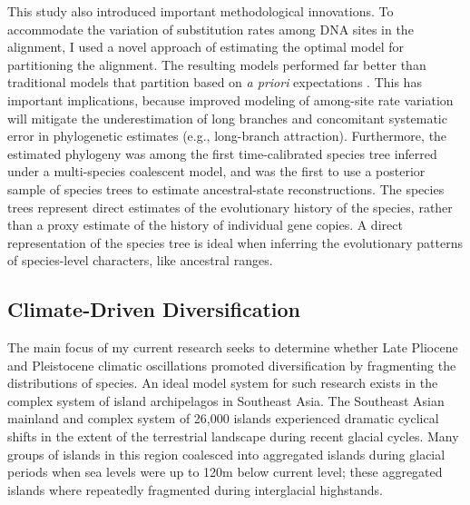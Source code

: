 \documentclass[10pt]{article}
\begin{document}
This study also introduced important methodological innovations.
To accommodate the variation of substitution rates among DNA sites in the alignment, I used a novel approach of estimating the optimal model for partitioning the alignment.
The resulting models performed far better than traditional models that partition based on \emph{a priori} expectations \cite{OaksInPrep}.
This has important implications, because improved modeling of among-site rate variation will mitigate the underestimation of long branches and concomitant systematic error in phylogenetic estimates (e.g., long-branch attraction).
Furthermore, the estimated phylogeny was among the first time-calibrated species tree inferred under a multi-species coalescent model, and was the first to use a posterior sample of species trees to estimate ancestral-state reconstructions.
The species trees represent direct estimates of the evolutionary history of the species, rather than a proxy estimate of the history of individual gene copies.
A direct representation of the species tree is ideal when inferring the evolutionary patterns of species-level characters, like ancestral ranges.

\subsection*{Climate-Driven Diversification}
The main focus of my current research seeks to determine whether Late Pliocene and Pleistocene climatic oscillations promoted diversification by fragmenting the distributions of species.
An ideal model system for such research exists in the complex system of island archipelagos in Southeast Asia.
The Southeast Asian mainland and complex system of 26,000\+ islands experienced dramatic cyclical shifts in the extent of the terrestrial landscape during recent glacial cycles.
Many groups of islands in this region coalesced into aggregated islands during glacial periods when sea levels were up to 120m below current level; these aggregated islands where repeatedly fragmented during interglacial highstands.
\end{document}
